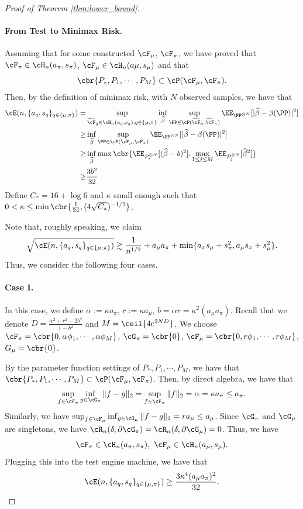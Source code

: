 \documentclass[11pt]{article}
\renewcommand{\tilde}[1]{\widetilde{#1}}
\renewcommand{\hat}[1]{\widehat{#1}}
\begin{document}
\begin{proof}[Proof of Theorem \ref{thm:lower_bound}]
\paragraph{From Test to Minimax Risk.} Assuming that for some constructed $\cF_{\mu}$, $\cF_{\pi}$, we have proved that $\cF_{\pi}\in\cH_n(a_\pi,s_\pi)$, $\cF_\mu\in\cH_{n}(a\mu,s_\mu)$ and that
\[
\cbr{P_*,P_1,\cdots,P_M}\subset \cP(\cF_\mu,\cF_\pi).
\]
Then, by the definition of minimax risk, with $N$ observed samples, we have that
\begin{align*}
     \cE(n,\{a_q,s_q\}_{q\in\{\mu,\pi\}})=&\sup_{\tilde{\cF}_{q}\in\cH_n(a_q,s_q),q\in\{\mu,\pi\}}\inf_{\hat{\beta}}\sup_{\PP\in\cP(\tilde{\cF}_{\mu},\tilde{\cF}_\pi)}\EE_{\PP^{\otimes N}}[|\hat{\beta}-\beta(\PP)|^2]\\
    \ge&\inf_{\hat{\beta}}\sup_{\PP\in\cP(\cF_{\mu},\cF_\pi)}\EE_{\PP^{\otimes N}}[|\hat{\beta}-\beta(\PP)|^2]\\
    \ge& \inf_{\hat{\beta}}\max\cbr{\EE_{P_*^{\otimes N}}[(\hat{\beta}-b)^2],\max_{1\le j\le M}\EE_{P_j^{\otimes N}}[\hat{\beta}^2]}\\
    \ge&\frac{3b^2}{32}
\end{align*}
Define $C_*=16+\log 6$ and $\kappa$ small enough such that $0<\kappa\le \min\cbr{\frac{1}{24},(4\sqrt{C_*})^{-1/2}}$.

Note that, roughly speaking, we claim
\[
\sqrt{ \cE(n,\{a_q,s_q\}_{q\in\{\mu,\pi\}})}\gtrsim  \frac{1}{n^{1/2}}+a_\mu a_\pi+\min\{a_{\pi}s_\mu+s_\pi^2,a_\mu s_\pi+s_\mu^2\}.
\]
Thus, we consider the following four cases.
\paragraph{Case I.} In this case, we define $\alpha:=\kappa a_{\pi}$, $r:=\kappa a_\mu$, $b=\alpha r=\kappa^2(a_\mu a_\pi)$. Recall that we denote $D=\frac{\alpha^2+r^2-2b^2}{1-b^2}$ and $M=\ceil{4e^{2ND}}$.
We choose $\cF_{\pi}=\cbr{0,\alpha\phi_1,\cdots,\alpha\phi_M}$, $\cG_{\pi}=\cbr{0}$, $\cF_{\mu}=\cbr{0,r\phi_1,\cdots,r\phi_M}$, $G_{\mu}=\cbr{0}$.

 By the parameter function settings of $P_*,P_1,\cdots,P_M$, we have that $\cbr{P_*,P_1,\cdots,P_M}\subset \cP(\cF_{\mu},\cF_\pi)$. Then, by direct algebra, we have that
\begin{align*}
    \sup_{f\in\cF_{\pi}}\inf_{g\in\cG_\pi}\|f-g\|_2=\sup_{f\in\cF_\pi}\|f\|_2=\alpha=\kappa a_{\pi}\le a_{\pi}.
\end{align*}
Similarly, we have $\sup_{f\in\cF_{\mu}}\inf_{g\in\cG_\mu}\|f-g\|_2=ra_\mu\le a_\mu$.
Since $\cG_{\pi}$ and $\cG_{\mu}$ are singletons, we have $\cR_n(\delta,\partial \cG_{\pi})=\cR_n(\delta,\partial \cG_{\mu})=0$. Thus, we have
\[
\cF_{\pi}\in\cH_n(a_\pi,s_{\pi}),\ \cF_\mu\in\cH_n(a_\mu,s_\mu).
\]
Plugging this into the test engine machine, we have that $$ \cE(n,\{a_q,s_q\}_{q\in\{\mu,\pi\}})\ge \frac{3\kappa^4 (a_\mu a_\pi)^2}{32}.$$


\end{proof}
\end{document}
